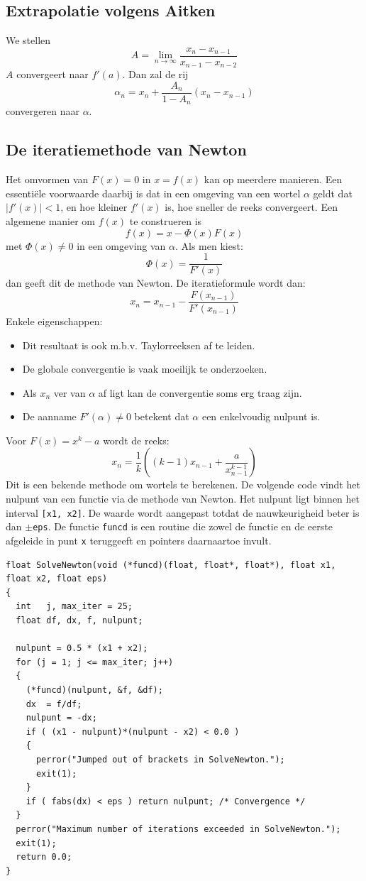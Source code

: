 \documentclass[twoside]{report}
\begin{document}
\subsection{Extrapolatie volgens Aitken}
We stellen
\[
A=\lim_{n\rightarrow\infty}\frac{x_n-x_{n-1}}{x_{n-1}-x_{n-2}}
\]
$A$ convergeert naar $f'(a)$. Dan zal de rij
\[
\alpha_n=x_n+\frac{A_n}{1-A_n}(x_n-x_{n-1})
\]
convergeren naar $\alpha$.

\subsection{De iteratiemethode van Newton}
Het omvormen van $F(x)=0$ in $x=f(x)$ kan op meerdere manieren. Een
essenti\"ele voorwaarde daarbij is dat in een omgeving van een wortel
$\alpha$ geldt dat $|f'(x)|<1$, en hoe kleiner $f'(x)$ is, hoe sneller
de reeks convergeert. Een algemene manier om $f(x)$ te construeren is
\[
f(x)=x-\Phi(x)F(x)
\]
met $\Phi(x)\neq0$ in een omgeving van $\alpha$. Als men kiest:
\[
\Phi(x)=\frac{1}{F'(x)}
\]
dan geeft dit de methode van Newton. De iteratieformule wordt dan:
\[
x_n=x_{n-1}-\frac{F(x_{n-1})}{F'(x_{n-1})}
\]
Enkele eigenschappen:
\begin{itemize}
\item Dit resultaat is ook m.b.v. Taylorreeksen af te leiden.
\item De globale convergentie is vaak moeilijk te onderzoeken.
\item Als $x_n$ ver van $\alpha$ af ligt kan de convergentie soms erg traag zijn.
\item De aanname $F'(\alpha)\neq0$ betekent dat $\alpha$ een enkelvoudig
      nulpunt is.
\end{itemize}
Voor $F(x)=x^k-a$ wordt de reeks:
\[
x_n=\frac{1}{k}\left((k-1)x_{n-1}+\frac{a}{x_{n-1}^{k-1}}\right)
\]
Dit is een bekende methode om wortels te berekenen.
\npar
De volgende code vindt het nulpunt van een functie via de methode van Newton.
Het nulpunt ligt binnen het interval {\tt [x1, x2]}. De waarde wordt
aangepast totdat de nauwkeurigheid beter is dan {\tt$\pm$eps}. De functie
{\tt funcd} is een routine die zowel de functie en de eerste afgeleide in
punt {\tt x} teruggeeft en pointers daarnaartoe invult.
\begin{verbatim}
float SolveNewton(void (*funcd)(float, float*, float*), float x1, float x2, float eps)
{
  int   j, max_iter = 25;
  float df, dx, f, nulpunt;

  nulpunt = 0.5 * (x1 + x2);
  for (j = 1; j <= max_iter; j++)
  {
    (*funcd)(nulpunt, &f, &df);
    dx  = f/df;
    nulpunt = -dx;
    if ( (x1 - nulpunt)*(nulpunt - x2) < 0.0 )
    {
      perror("Jumped out of brackets in SolveNewton.");
      exit(1);
    }
    if ( fabs(dx) < eps ) return nulpunt; /* Convergence */
  }
  perror("Maximum number of iterations exceeded in SolveNewton.");
  exit(1);
  return 0.0;
}
\end{verbatim}
\end{document}
